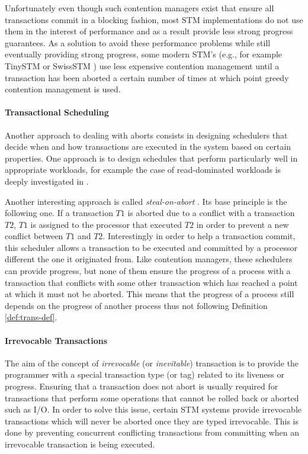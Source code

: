 Unfortunately even though such contention managers exist that ensure
all transactions commit in a blocking fashion, most
STM implementations do not use them in the interest of performance
and as a result provide less strong progress guarantees.
As a solution to avoid these performance problems while still
eventually providing strong progress,  some modern  STM's (e.g., for example  
TinySTM  \cite{FFR08}   or  SwissSTM   \cite{DGK09})  use   less  expensive
contention  management  until  a transaction  has been  aborted a  certain
number  of times  at  which point greedy contention management is used. 

\paragraph{Transactional Scheduling}
Another approach to dealing with aborts consists in designing  schedulers that decide
when and how transactions are executed in the system based on certain
properties.
One approach is to design schedules that perform 
particularly well in appropriate workloads, for example the case of
read-dominated workloads is deeply investigated in \cite{AM09}.

Another interesting approach is
called  {\it steal-on-abort} \cite{ALKJKW09}. 
Its  base principle is the  following one.  If  a transaction $T1$
is  aborted  due to  a  conflict with a transaction  $T2$,  $T1$ is
assigned to  the processor  that executed  $T2$ in order  to prevent  
a new conflict between   $T1$ and  $T2$. 
Interestingly in order to help a transaction commit,  
this scheduler allows a transaction to be executed and committed
by a processor different  the one it originated from. 
Like  contention  managers, these  schedulers  can  provide
progress,  but  none of  them  ensure  the progress  of  a  process with  a
transaction that conflicts with some  other transaction which has reached a
point at which it  must not be aborted. This means that  the  progress of a
process still  depends on the progress  of another process thus not following
Definition \ref{def:trans-def}. 


\paragraph{Irrevocable Transactions} 
The  aim  of  the  concept   of  {\it  irrevocable}  (or  {\it  inevitable})
transaction  is  to   provide  the   programmer  with  a  special 
transaction type (or tag) related to its liveness or progress. 
%
Ensuring  that  a  transaction  does  not abort  is  usually  required  for
transactions  
that perform some operations that cannot be rolled back or aborted such as I/O.
In order to solve this issue, certain STM systems provide irrevocable 
transactions which will never be aborted once they are typed  irrevocable.
This is done by preventing concurrent conflicting transactions from 
committing when an irrevocable transaction is being executed.

